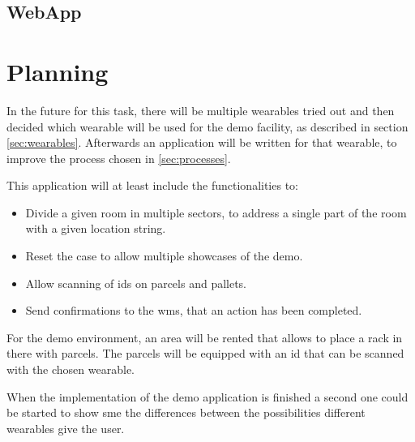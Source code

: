 \subsection{WebApp}

\section{Planning}
In the future for this task, there will be multiple wearables tried out and then decided which wearable will be used for the demo facility, as described in section \ref{sec:wearables}. Afterwards an application will be written for that wearable, to improve the process chosen in \ref{sec:processes}. 

This application will at least include the functionalities to:
\begin{itemize}
	\item Divide a given room in multiple sectors, to address a single part of the room with a given location string.
	\item Reset the case to allow multiple showcases of the demo.
	\item Allow scanning of \gls{id}s on \gls{parcel}s and pallets.
	\item Send confirmations to the \gls{wms}, that an action has been completed.
\end{itemize}

For the demo environment, an area will be rented that allows to place a rack in there with \gls{parcel}s. The \gls{parcel}s will be equipped with an \gls{id} that can be scanned with the chosen wearable.

When the implementation of the demo application is finished a second one could be started to show \gls{sme} the differences between the possibilities different wearables give the user.
